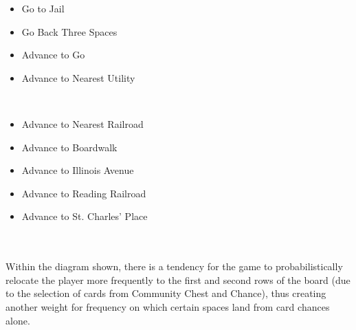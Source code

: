\documentclass[12pt]{article}
\begin{document}
\begin{minipage}{0.5\textwidth}
\begin{flushleft}
\begin{itemize}
  \item {Go to Jail}
  \item {Go Back Three Spaces}
  \item {Advance to Go}
  \item {Advance to Nearest Utility}
\end{itemize}
\end{flushleft}
\end{minipage}
~
\begin{minipage}{0.5\textwidth}
\begin{flushleft} 
\begin{itemize}
  \item {Advance to Nearest Railroad}
  \item {Advance to Boardwalk}
  \item {Advance to Illinois Avenue}
  \item {Advance to Reading Railroad}
  \item {Advance to St. Charles' Place}
\end{itemize}
\end{flushleft}
\end{minipage}
\\
\\
Within the diagram shown, there is a tendency for the game to probabilistically relocate the player more frequently to the first and second rows of the board (due to the selection of cards from Community Chest and Chance), thus creating another weight for frequency on which certain spaces land from card chances alone.
\end{document}
